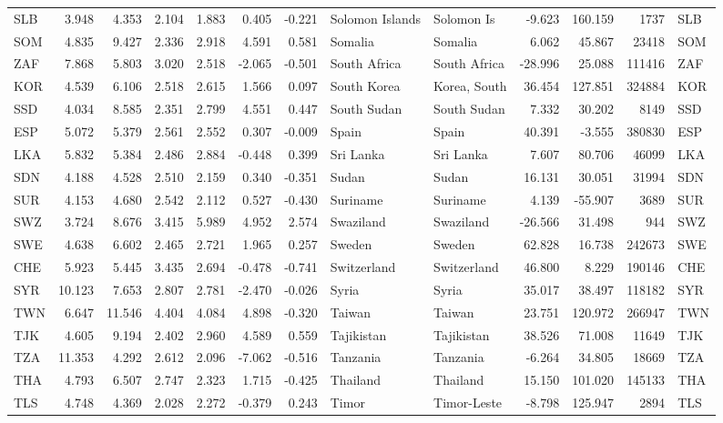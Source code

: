 \begin{tabular}{lrrrrrrllrrrl}
SLB & 3.948 & 4.353 & 2.104 & 1.883 & 0.405 & -0.221 & Solomon Islands & Solomon Is & -9.623 & 160.159 & 1737 & SLB \\
SOM & 4.835 & 9.427 & 2.336 & 2.918 & 4.591 & 0.581 & Somalia & Somalia & 6.062 & 45.867 & 23418 & SOM \\
ZAF & 7.868 & 5.803 & 3.020 & 2.518 & -2.065 & -0.501 & South Africa & South Africa & -28.996 & 25.088 & 111416 & ZAF \\
KOR & 4.539 & 6.106 & 2.518 & 2.615 & 1.566 & 0.097 & South Korea & Korea, South & 36.454 & 127.851 & 324884 & KOR \\
SSD & 4.034 & 8.585 & 2.351 & 2.799 & 4.551 & 0.447 & South Sudan & South Sudan & 7.332 & 30.202 & 8149 & SSD \\
ESP & 5.072 & 5.379 & 2.561 & 2.552 & 0.307 & -0.009 & Spain & Spain & 40.391 & -3.555 & 380830 & ESP \\
LKA & 5.832 & 5.384 & 2.486 & 2.884 & -0.448 & 0.399 & Sri Lanka & Sri Lanka & 7.607 & 80.706 & 46099 & LKA \\
SDN & 4.188 & 4.528 & 2.510 & 2.159 & 0.340 & -0.351 & Sudan & Sudan & 16.131 & 30.051 & 31994 & SDN \\
SUR & 4.153 & 4.680 & 2.542 & 2.112 & 0.527 & -0.430 & Suriname & Suriname & 4.139 & -55.907 & 3689 & SUR \\
SWZ & 3.724 & 8.676 & 3.415 & 5.989 & 4.952 & 2.574 & Swaziland & Swaziland & -26.566 & 31.498 & 944 & SWZ \\
SWE & 4.638 & 6.602 & 2.465 & 2.721 & 1.965 & 0.257 & Sweden & Sweden & 62.828 & 16.738 & 242673 & SWE \\
CHE & 5.923 & 5.445 & 3.435 & 2.694 & -0.478 & -0.741 & Switzerland & Switzerland & 46.800 & 8.229 & 190146 & CHE \\
SYR & 10.123 & 7.653 & 2.807 & 2.781 & -2.470 & -0.026 & Syria & Syria & 35.017 & 38.497 & 118182 & SYR \\
TWN & 6.647 & 11.546 & 4.404 & 4.084 & 4.898 & -0.320 & Taiwan & Taiwan & 23.751 & 120.972 & 266947 & TWN \\
TJK & 4.605 & 9.194 & 2.402 & 2.960 & 4.589 & 0.559 & Tajikistan & Tajikistan & 38.526 & 71.008 & 11649 & TJK \\
TZA & 11.353 & 4.292 & 2.612 & 2.096 & -7.062 & -0.516 & Tanzania & Tanzania & -6.264 & 34.805 & 18669 & TZA \\
THA & 4.793 & 6.507 & 2.747 & 2.323 & 1.715 & -0.425 & Thailand & Thailand & 15.150 & 101.020 & 145133 & THA \\
TLS & 4.748 & 4.369 & 2.028 & 2.272 & -0.379 & 0.243 & Timor & Timor-Leste & -8.798 & 125.947 & 2894 & TLS \\

\end{tabular}
